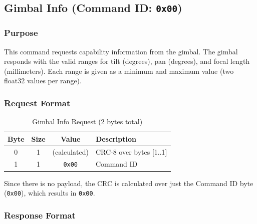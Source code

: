 \documentclass[12pt, titlepage]{article}
\begin{document}
\subsection{Gimbal Info (Command ID: \texttt{0x00})}

\subsubsection{Purpose}
This command requests capability information from the gimbal. The gimbal
responds with the valid ranges for tilt (degrees), pan (degrees), and focal
length (millimeters). Each range is given as a minimum and maximum value (two
float32 values per range).

\subsubsection{Request Format}

\begin{table}[H]
  \centering
  \begin{tabular}{cccl}
    \toprule
    \textbf{Byte} & \textbf{Size} & \textbf{Value} & \textbf{Description}    \\
    \midrule
    0             & 1             & (calculated)   & CRC-8 over bytes [1..1] \\
    1             & 1             & \texttt{0x00}  & Command ID              \\
    \bottomrule
  \end{tabular}
  \caption{Gimbal Info Request (2 bytes total)}
\end{table}

Since there is no payload, the CRC is calculated over just the Command ID byte
(\texttt{0x00}), which results in \texttt{0x00}.

\subsubsection{Response Format}
\end{document}
